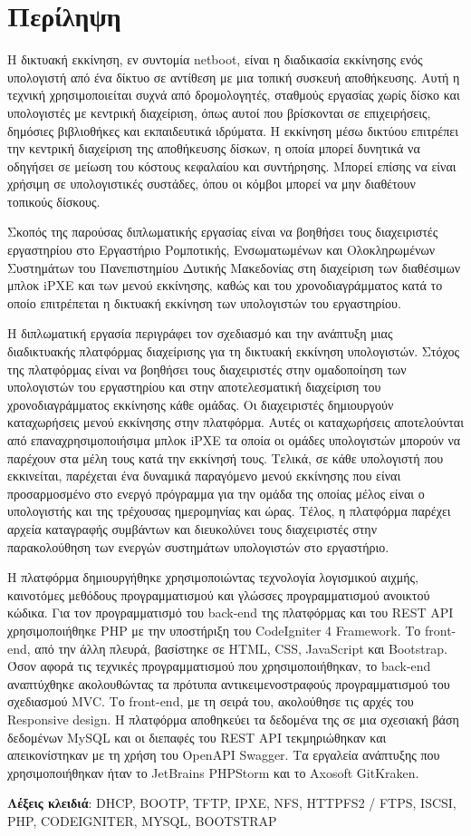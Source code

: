 \chapter*{Περίληψη}
Η δικτυακή εκκίνηση, εν συντομία netboot, είναι η διαδικασία εκκίνησης ενός υπολογιστή από ένα δίκτυο σε αντίθεση με μια τοπική συσκευή αποθήκευσης. Αυτή η τεχνική χρησιμοποιείται συχνά από δρομολογητές, σταθμούς εργασίας χωρίς δίσκο και υπολογιστές με κεντρική διαχείριση, όπως αυτοί που βρίσκονται σε επιχειρήσεις, δημόσιες βιβλιοθήκες και εκπαιδευτικά ιδρύματα. Η εκκίνηση μέσω δικτύου επιτρέπει την κεντρική διαχείριση της αποθήκευσης δίσκων, η οποία μπορεί δυνητικά να οδηγήσει σε μείωση του κόστους κεφαλαίου και συντήρησης. Μπορεί επίσης να είναι χρήσιμη σε υπολογιστικές συστάδες, όπου οι κόμβοι μπορεί να μην διαθέτουν τοπικούς δίσκους.

Σκοπός της παρούσας διπλωματικής εργασίας είναι να βοηθήσει τους διαχειριστές εργαστηρίου στο Εργαστήριο Ρομποτικής, Ενσωματωμένων και Ολοκληρωμένων Συστημάτων του Πανεπιστημίου Δυτικής Μακεδονίας στη διαχείριση των διαθέσιμων μπλοκ iPXE και των μενού εκκίνησης, καθώς και του χρονοδιαγράμματος κατά το οποίο επιτρέπεται η δικτυακή εκκίνηση των υπολογιστών του εργαστηρίου.

Η διπλωματική εργασία περιγράφει τον σχεδιασμό και την ανάπτυξη μιας διαδικτυακής πλατφόρμας διαχείρισης για τη δικτυακή εκκίνηση υπολογιστών. Στόχος της πλατφόρμας είναι να βοηθήσει τους διαχειριστές στην ομαδοποίηση των υπολογιστών του εργαστηρίου και στην αποτελεσματική διαχείριση του χρονοδιαγράμματος εκκίνησης κάθε ομάδας. Οι διαχειριστές δημιουργούν καταχωρήσεις μενού εκκίνησης στην πλατφόρμα. Αυτές οι καταχωρήσεις αποτελούνται από επαναχρησιμοποιήσιμα μπλοκ iPXE τα οποία οι ομάδες υπολογιστών μπορούν να παρέχουν στα μέλη τους κατά την εκκίνησή τους. Τελικά, σε κάθε υπολογιστή που εκκινείται, παρέχεται ένα δυναμικά παραγόμενο μενού εκκίνησης που είναι προσαρμοσμένο στο ενεργό πρόγραμμα για την ομάδα της οποίας μέλος είναι ο υπολογιστής και της τρέχουσας ημερομηνίας και ώρας. Τέλος, η πλατφόρμα παρέχει αρχεία καταγραφής συμβάντων και διευκολύνει τους διαχειριστές στην παρακολούθηση των ενεργών συστημάτων υπολογιστών στο εργαστήριο.

Η πλατφόρμα δημιουργήθηκε χρησιμοποιώντας τεχνολογία λογισμικού αιχμής, καινοτόμες μεθόδους προγραμματισμού και γλώσσες προγραμματισμού ανοικτού κώδικα. Για τον προγραμματισμό του back-end της πλατφόρμας και του REST API χρησιμοποιήθηκε PHP με την υποστήριξη του CodeIgniter 4 Framework. Το front-end, από την άλλη πλευρά, βασίστηκε σε HTML, CSS, JavaScript και Bootstrap. Όσον αφορά τις τεχνικές προγραμματισμού που χρησιμοποιήθηκαν, το back-end αναπτύχθηκε ακολουθώντας τα πρότυπα αντικειμενοστραφούς προγραμματισμού του σχεδιασμού MVC. Το front-end, με τη σειρά του, ακολούθησε τις αρχές του Responsive design. Η πλατφόρμα αποθηκεύει τα δεδομένα της σε μια σχεσιακή βάση δεδομένων MySQL και οι διεπαφές του REST API τεκμηριώθηκαν και απεικονίστηκαν με τη χρήση του OpenAPI Swagger. Τα εργαλεία ανάπτυξης που χρησιμοποιήθηκαν ήταν το JetBrains PHPStorm και το Axosoft GitKraken.

\vfill
\textbf{Λέξεις κλειδιά}: DHCP, BOOTP, TFTP, IPXE, NFS, HTTPFS2 / FTPS, ISCSI, PHP, CODEIGNITER, MYSQL, BOOTSTRAP
